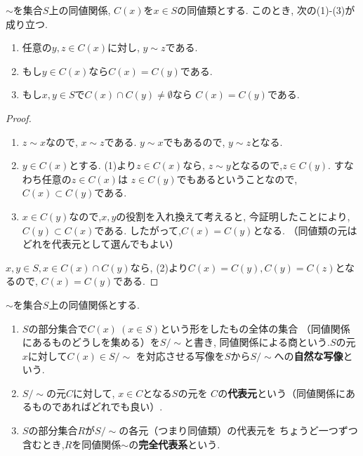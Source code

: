 \begin{tcolorbox}
	\begin{prp*}
		$\sim$を集合$S$上の同値関係, $C(x)$を$x\in S$の同値類とする.
		このとき, 次の(1)-(3)が成り立つ.
		\begin{enumerate}
			\item 任意の$y,z \in C(x)$に対し, $y \sim z$である.
			\item もし$y \in C(x)$なら$C(x)=C(y)$である.
			\item もし$x,y \in S$で$C(x)\cap C(y)\neq \emptyset$なら
			$C(x)=C(y)$である.
		\end{enumerate}
	\end{prp*}
\end{tcolorbox}
\begin{proof}
	\begin{enumerate}
		\item $z\sim x$なので, $x\sim z$である. $y \sim x$でもあるので, $y\sim z$となる.
		\item $ y \in C(x)$とする. (1)より$z \in C(x)$なら, 
			$z \sim y$となるので,$z \in C(y)$. すなわち任意の$z \in C(x)$は
			$z \in C(y)$でもあるということなので,$C(x) \subset  C(y)$である.
		\item $x \in C(y)$なので,$x,y$の役割を入れ換えて考えると, 
			今証明したことにより, $C(y) \subset C(x)$である. 
			したがって,$C(x)=C(y)$となる.
			（同値類の元はどれを代表元として選んでもよい）
	\end{enumerate}
  $x,y \in S, x \in C(x)\cap C(y)$なら, (2)より$C(x)=C(y), C(y)=C(z)$となるので,
  $C(x)=C(y)$である.
\end{proof}\leavevmode

\begin{dfn*}$\sim$を集合$S$上の同値関係とする.
	\begin{enumerate}
		\item $S$の部分集合で$C(x)\: (x \in S)$という形をしたもの全体の集合
			（同値関係にあるものどうしを集める）を$S/\sim$と書き, 
			同値関係による商という.$S$の元$x$に対して$C(x)\in S/\sim$
			を対応させる写像を$S$から$S/\sim$への\textbf{自然な写像}という.
		\item $S/\sim$の元$C$に対して, $x \in C$となる$S$の元を
			$C$の\textbf{代表元}という（同値関係にあるものであればどれでも良い）.
		\item $S$の部分集合$R$が$S/\sim$の各元（つまり同値類）の代表元を
			ちょうど一つずつ含むとき,$R$を同値関係$\sim$の\textbf{完全代表系}という.
	\end{enumerate}
\end{dfn*}

